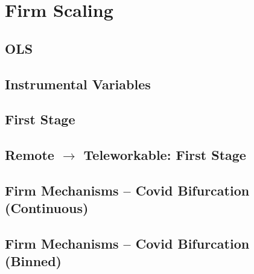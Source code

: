 \documentclass{article}
\newcommand{\cleanedresultsdir}{../results/cleaned}
\begin{document}

\clearpage
\section{Firm Scaling}

\subsection{OLS}


\subsection{Instrumental Variables}


\subsection{First Stage}


\subsection{Remote $\rightarrow$ Teleworkable: First Stage}


\clearpage
\begin{landscape}
\subsection{Firm Mechanisms – Covid Bifurcation (Continuous)}

\end{landscape}

\begin{landscape}
\subsection{Firm Mechanisms – Covid Bifurcation (Binned)}

\end{landscape}
\end{document}
